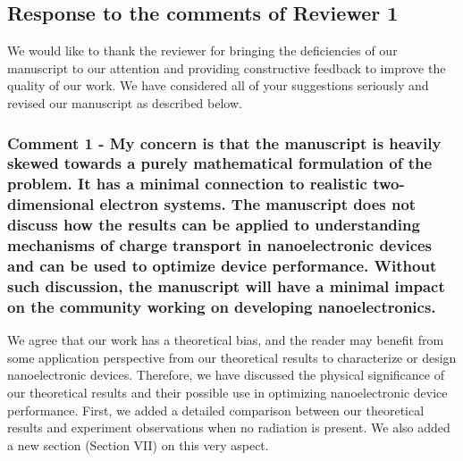 \documentclass{article}
\begin{document}
\subsection*{Response to the comments of Reviewer 1}

We would like to thank the reviewer for bringing the deficiencies of our manuscript to our attention and providing constructive feedback to improve the quality of our work. We have considered all of your suggestions seriously and revised our manuscript as described below.

\subsubsection*{Comment 1 -
\color{RoyalBlue} My concern is that the manuscript is heavily skewed towards a purely mathematical formulation of the problem. It has a minimal connection to realistic two-dimensional electron systems. The manuscript does not discuss how the results can be applied to understanding mechanisms of charge transport in nanoelectronic devices and can be used to optimize device performance. Without such discussion, the manuscript will have a minimal impact on the community working on developing nanoelectronics.}

We agree that our work has a theoretical bias, and the reader may benefit from some application perspective from our theoretical results to characterize or design nanoelectronic devices. Therefore, we have discussed the physical significance of our theoretical results and their possible use in optimizing nanoelectronic device performance. First, we added a detailed comparison between our theoretical results and experiment observations when no radiation is present.  We also added a new section (Section VII) on this very aspect.
\end{document}
